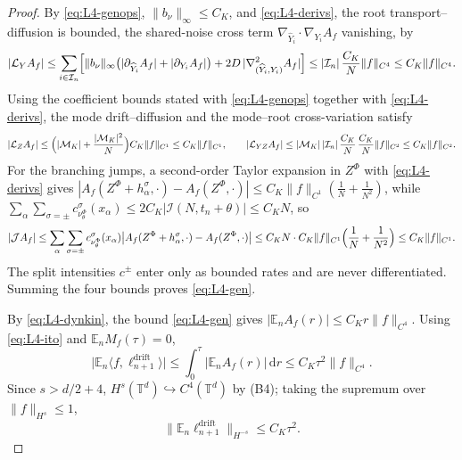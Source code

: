 \documentclass[a4paper,fleqn]{cas-sc}
\theoremstyle{definition}
\theoremstyle{remark}
\begin{document}
\begin{proof}
By \eqref{eq:L4-genops}, $\|b_\nu\|_\infty\le C_K$, and \eqref{eq:L4-derivs}, the root
transport--diffusion is bounded, the shared-noise cross term $\nabla_{\widehat Y_i}\!\cdot\!\nabla_{Y_i}A_f$
vanishing, by
\[
|\mathcal L_YA_f|
\le\sum_{i\in\mathcal I_n}\Bigl[\|b_\nu\|_\infty\bigl(|\partial_{\widehat Y_i}A_f|+|\partial_{Y_i}A_f|\bigr)
+2D\,|\nabla^2_{(\widehat Y_i,Y_i)}A_f|\Bigr]
\le|\mathcal I_n|\,\frac{C_K}N\|f\|_{C^4}\le C_K\|f\|_{C^4}.
\]
Using the coefficient bounds stated with \eqref{eq:L4-genops} together with \eqref{eq:L4-derivs},
the mode drift--diffusion and the mode--root cross-variation satisfy
\[
|\mathcal L_ZA_f|\le\Bigl(|\mathcal M_K|+\frac{|\mathcal M_K|^2}N\Bigr)C_K\|f\|_{C^1}\le C_K\|f\|_{C^1},
\qquad
|\mathcal L_{YZ}A_f|
\le|\mathcal M_K|\,|\mathcal I_n|\,\frac{C_K}{N}\,\frac{C_K}N\|f\|_{C^2}\le C_K\|f\|_{C^2}.
\]
For the branching jumps, a second-order Taylor expansion in $Z^\Phi$ with \eqref{eq:L4-derivs} gives
$|A_f(Z^\Phi+h^\sigma_\alpha,\cdot)-A_f(Z^\Phi,\cdot)|\le C_K\|f\|_{C^1}(\tfrac1N+\tfrac1{N^2})$,
while $\sum_\alpha\sum_{\sigma=\pm}c^\sigma_{\nu^\Phi_\theta}(x_\alpha)\le2C_K|\mathcal I(N,t_n+\theta)|\le C_KN$, so
\[
|\mathcal JA_f|
\le\sum_{\alpha}\sum_{\sigma=\pm}c^\sigma_{\nu^\Phi_\theta}(x_\alpha)\bigl|A_f(Z^\Phi+h^\sigma_\alpha,\cdot)-A_f(Z^\Phi,\cdot)\bigr|
\le C_KN\cdot C_K\|f\|_{C^1}\Bigl(\frac1N+\frac1{N^2}\Bigr)\le C_K\|f\|_{C^1}.
\]
The split intensities $c^\pm$ enter only as bounded rates and are never differentiated. Summing the
four bounds proves \eqref{eq:L4-gen}.

By \eqref{eq:L4-dynkin}, the bound \eqref{eq:L4-gen} gives $|\mathbb E_nA_f(r)|\le C_Kr\|f\|_{C^4}$.
Using \eqref{eq:L4-ito}
and $\mathbb E_nM_f(\tau)=0$,
\[
\bigl|\mathbb E_n\langle f,\ell^{\mathrm{drift}}_{n+1}\rangle\bigr|
\le\int_0^\tau|\mathbb E_nA_f(r)|\,\mathrm dr\le C_K\tau^2\|f\|_{C^4}.
\]
Since $s>d/2+4$, $H^s(\mathbb T^d)\hookrightarrow C^4(\mathbb T^d)$ by (B4); taking the
supremum over $\|f\|_{H^s}\le1$,
\[
\|\mathbb E_n\ell^{\mathrm{drift}}_{n+1}\|_{H^{-s}}\le C_K\tau^2.
\]


\end{proof}
\end{document}

